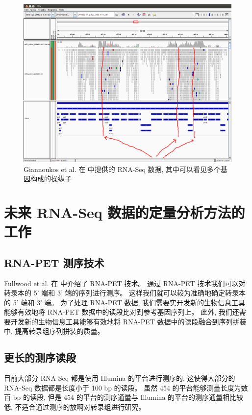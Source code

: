 \begin{figure}[!t]
\centering
\includegraphics[width=\textwidth]{figures/disc/disc-bacteria-operons-1.png}
\caption{Giannoukos et al. 在  中提供的 RNA-Seq 数据, 
其中可以看见多个基因构成的操纵子}
\label{disc-bacteria-operons-1}
\end{figure}

\section{未来 RNA-Seq 数据的定量分析方法的工作}

\subsection{RNA-PET 测序技术} %
Fullwood et al. 在  中介绍了 RNA-PET 技术。 
通过 RNA-PET 技术我们可以对转录本的 5' 端和 3' 端的序列进行测序。 
这样我们就可以较为准确地确定转录本的 5' 端和 3' 端。 
为了处理 RNA-PET 数据, 我们需要实开发新的生物信息工具能够有效地将 RNA-PET 
数据中的读段比对到参考基因序列上。 此外, 我们还需要开发新的生物信息工具能够有效地将 RNA-PET 
数据中的读段融合到序列拼装中, 提高转录组序列拼装的质量。 

\subsection{更长的测序读段} %
目前大部分 RNA-Seq 都是使用 Illumina 的平台进行测序的, 
这使得大部分的 RNA-Seq 数据都是长度小于 100 bp 的读段。 
虽然 454 的平台能够测量长度为数百 bp 的读段, 
但是 454 的平台的测序通量与 Illumina 的平台的测序通量相比较低, 
不适合通过测序的放啊对转录组进行研究。 

